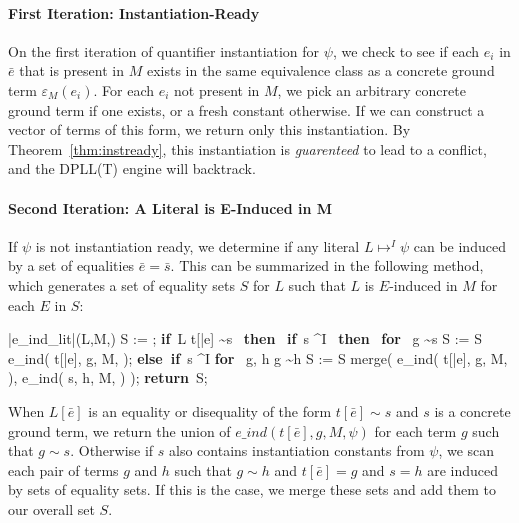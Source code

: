 \documentclass{llncs}
\def\IF{\qtab\keyword{if}\ }
\def\THEN{\ \keyword{then}\ }
\def\ELSEIF{\untab\qtab\keyword{else if}\ }
\def\FI{\untab}
\def\RETURN{\keyword{return}\ }
\def\ENDPROC{\untab}
\def\DOFOR{\qtab\keyword{for}\ }
\def\ENDFOR{\untab}
\def\keyword#1{\mbox{\normalshape\bf #1}}
\begin{document}
\paragraph{First Iteration: Instantiation-Ready}

On the first iteration of quantifier instantiation for $\psi$, we check to see if each $e_i$ in $\bar{e}$ that is present in $M$ exists in the same equivalence class as a concrete ground term $\varepsilon_M(e_i)$.
For each $e_i$ not present in $M$, we pick an arbitrary concrete ground term if one exists, or a fresh constant otherwise.
If we can construct a vector of terms of this form, we return only this instantiation.
By Theorem~\ref{thm:instready}, this instantiation is \emph{guarenteed} to lead to a conflict, and the DPLL(T) engine will backtrack.

\paragraph{Second Iteration: A Literal is E-Induced in M}

If $\psi$ is not instantiation ready, we determine if any literal $L \mapsto^I \psi$ can be induced by a set of equalities $\bar{e} = \bar{s}$.
This can be summarized in the following method, which generates a set of equality sets $S$ for $L$ such that $L$ is $E$-induced in $M$ for each $E$ in $S$:

\begin{minipage}[t]{.4\linewidth}
\begin{program}
\PROC |e\_ind\_lit|(L,M,\psi) \BODY
  S := \emptyset;
  \IF L  t[\bar{e}] \sim s \THEN
    \IF s \mapsto^I \emptyset \THEN
      \DOFOR {} g \sim s
        S := S \cup e\_ind( t[\bar{e}], g, M, \psi );
      \ENDFOR
    \ELSEIF s \mapsto^I \psi
      \DOFOR {} g, h  g \sim h
        S := S \cup merge( e\_ind( t[\bar{e}], g, M, \psi ), e\_ind( s, h, M, \psi ) );
      \ENDFOR 
    \FI
  \FI
  \RETURN S;
\ENDPROC
\end{program}
\end{minipage}

When $L[\bar{e}]$ is an equality or disequality of the form $t[\bar{e}] \sim s$ and $s$ is a concrete ground term, we return the union of $e\_ind( t[\bar{e}], g, M, \psi )$ for each term $g$ such that $g \sim s$.
Otherwise if $s$ also contains instantiation constants from $\psi$, we scan each pair of terms $g$ and $h$ such that $g \sim h$ and $t[\bar{e}] = g$ and $s = h$ are induced by sets of equality sets.
If this is the case, we merge these sets and add them to our overall set $S$.
\end{document}
